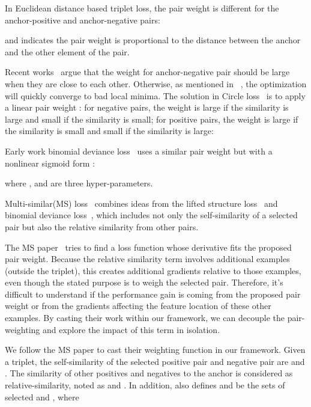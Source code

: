 \documentclass[10pt,twocolumn,letterpaper]{article}
\begin{document}
In Euclidean distance based triplet loss, the pair weight  is different for the anchor-positive and anchor-negative pairs:

and indicates the pair weight is proportional to the distance between the anchor and the other element of the pair.

Recent works~\cite{Sun_2020_CVPR, wang2019multi, Xuan_2020_ECCV} argue that the weight for anchor-negative pair should be large when they are close to each other. Otherwise, as mentioned in ~\cite{Xuan_2020_ECCV}, the optimization will quickly converge to bad local minima. The solution in Circle loss~\cite{Sun_2020_CVPR} is to apply a linear pair weight : for negative pairs, the weight is large if the similarity is large and small if the similarity is small; for positive pairs, the weight is large if the similarity is small and small if the similarity is large:


Early work binomial deviance loss~\cite{yi2014deep} uses a similar pair weight but with a nonlinear sigmoid form :

where ,  and  are three hyper-parameters. 

Multi-similar(MS) loss~\cite{wang2019multi} combines ideas from the lifted structure loss~\cite{SOP} and binomial deviance loss~\cite{yi2014deep}, which includes not only the self-similarity of a selected pair but also the relative similarity from other pairs.  

The MS paper~\cite{wang2019multi} tries to find a loss function whose derivative fits the proposed pair weight.  Because the relative similarity term involves additional examples (outside the triplet), this creates additional gradients relative to those examples, even though the stated purpose is to weigh the selected pair.  Therefore, it's difficult to understand if the performance gain is coming from the proposed pair weight or from the gradients affecting the feature location of these other examples.  By casting their work within our framework, we can decouple the pair-weighting and explore the impact of this term in isolation.

We follow the MS paper to cast their weighting function  in our framework.  Given a triplet, the self-similarity of the selected positive pair and negative pair are  and . The similarity of other positives and negatives to the anchor is considered as relative-similarity, noted as  and . In addition, \cite{wang2019multi} also defines  and  be the sets of selected  and , where 
\end{document}
